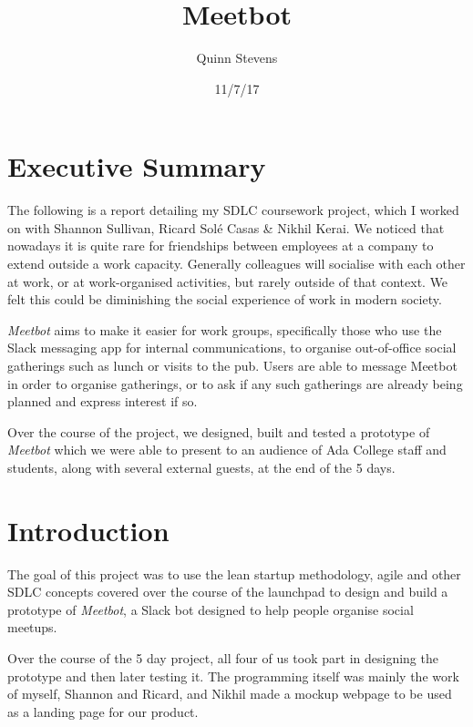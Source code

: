 \documentclass[12pt]{report}
\author{Quinn Stevens}
\title{Meetbot}
\date{11/7/17}
\begin{document}
\maketitle
\section*{Executive Summary} \label{execsum}
The following is a report detailing my SDLC coursework project, which I worked on with Shannon Sullivan, Ricard Sol\'e Casas \& Nikhil Kerai. We noticed that nowadays it is quite rare for friendships between employees at a company to extend outside a work capacity. Generally colleagues will socialise with each other at work, or at work-organised activities, but rarely outside of that context. We felt this could be diminishing the social experience of work in modern society.

\vspace{3mm}

\emph{Meetbot} aims to make it easier for work groups, specifically those who use the Slack messaging app for internal communications, to organise out-of-office social gatherings such as lunch or visits to the pub. Users are able to message Meetbot in order to organise gatherings, or to ask if any such gatherings are already being planned and express interest if so.

\vspace{3mm}

Over the course of the project, we designed, built and tested a prototype of \emph{Meetbot} which we were able to present to an audience of Ada College staff and students, along with several external guests, at the end of the 5 days.
\tableofcontents

\section{Introduction} \label{intro}
The goal of this project was to use the lean startup methodology, agile and other SDLC concepts covered over the course of the launchpad to design and build a prototype of \emph{Meetbot}, a Slack bot designed to help people organise social meetups.

\vspace{3mm}

Over the course of the 5 day project, all four of us took part in designing the prototype and then later testing it. The programming itself was mainly the work of myself, Shannon and Ricard, and Nikhil made a mockup webpage to be used as a landing page for our product.
\end{document}
